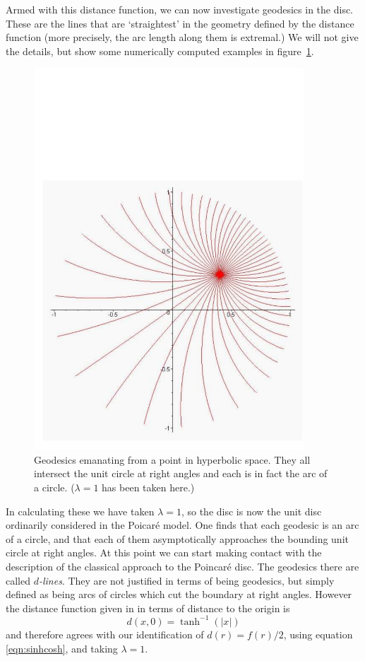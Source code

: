 Armed with this distance function, we can now investigate
geodesics in the disc. These are the lines that are `straightest'
in the geometry defined by the distance function (more precisely,
the arc length along them is extremal.) We will not give the
details, but show some numerically computed examples in
figure~\ref{fig:hyper-geos}.
%
\begin{figure} \label{fig:hyper-geos}
\centerline{\includegraphics[width=0.9\textwidth]{hyper_geos}}
\caption{Geodesics emanating from a point in hyperbolic space.
They all intersect the unit circle at right angles and each is in
fact the arc of a circle. ($\lambda=1$ has been taken here.) }
\end{figure}
%
In calculating these we have taken $\lambda=1$, so the disc is now
the unit disc ordinarily considered in the Poicar\'e model. One
finds that each geodesic is an arc of a circle, and that each of
them asymptotically approaches the bounding unit circle at right
angles. At this point we can start making contact with the
description of the classical approach to the Poincar\'e
disc\cite{GEOM:Brannan}. The geodesics there are called {\em $d$-lines}.
They are not justified in terms of being geodesics, but simply
defined as being arcs of circles which cut the boundary at right
angles. However the distance function given in \cite{GEOM:Brannan}
in terms of distance to the origin is
%
\begin{equation}
d(x,0) = \tanh^{-1}(|x|)
\end{equation}
%
and therefore agrees with our identification of $d(r)=
f(r)/2$, using equation \ref{eqn:sinhcosh}, and
taking $\lambda=1$.

